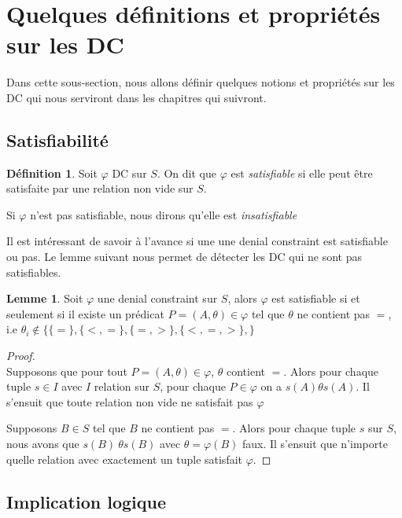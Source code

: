 \documentclass[letterpaper, 12pt]{report}
\theoremstyle{definition}
\newtheorem{mydef}{Définition}
\newtheorem{mylemma}{Lemme}
\newcommand{\alinea}{
\hspace*{0.5cm}}
\begin{document}
\section{Quelques définitions et propriétés sur les DC}

Dans cette sous-section, nous allons définir quelques notions et propriétés sur les DC qui nous serviront dans les chapitres qui suivront.

\subsection{Satisfiabilité}

\begin{mydef}
Soit $\varphi$ DC sur $S$. On dit que $\varphi$ est \emph{satisfiable} si elle peut être satisfaite par une relation non vide sur $S$.

Si $\varphi$ n'est pas satisfiable, nous dirons qu'elle est \emph{insatisfiable} 
\end{mydef}

Il est intéressant de savoir à l'avance si une une denial constraint est satisfiable ou pas. Le lemme suivant nous permet de détecter les DC qui ne sont pas satisfiables.

\begin{mylemma}\label{satisLemma}
	Soit $\varphi$ une denial constraint sur $S$, alors $\varphi$ est satisfiable si et seulement si il existe un prédicat $P = (A,\theta)  \in \varphi$ tel que $\theta$ ne contient pas $=$, i.e $\theta_i \not\in \{ \{=\},\{<,=\},\{=,>\},\{<,=,>\},\} $ 
\end{mylemma}
\begin{proof}~\\
\alinea \framebox{$\implies$} Supposons que pour tout $P=(A,\theta) \in \varphi$, $\theta$ contient $=$. Alors pour chaque tuple $s \in I$ avec $I$ relation sur $S$, pour chaque $P \in \varphi$ on a $s(A) \theta s(A)$. Il s'ensuit que toute relation non vide ne satisfait pas $\varphi$

\framebox{$\impliedby$} Supposons $B \in S$ tel que $B$ ne contient pas $=$. Alors pour chaque tuple $s$ sur $S$, nous avons que $s(B)\ \theta s(B)$ avec $\theta=\varphi(B)$ faux. Il s'ensuit que n'importe quelle relation avec exactement un tuple satisfait $\varphi$.

\end{proof}


\subsection{Implication logique}
\end{document}
